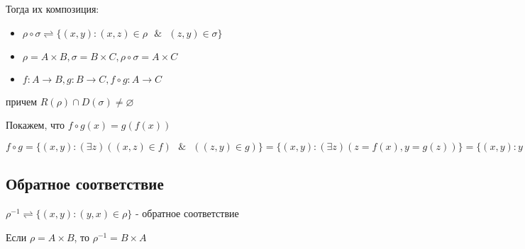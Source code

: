 \documentclass{report}
\newcommand{\band}{\mbox{ } \& \mbox{ }}
\begin{document}
\medskip

Тогда их композиция:
\begin{itemize}
	\item $\rho \circ \sigma \rightleftharpoons \{(x,y): (x,z) \in \rho \band (z,y) \in \sigma\}$
	\item  $\rho = A \times B, \sigma = B \times C, \rho \circ \sigma = A \times C$
	\item $f: A \rightarrow B, g: B \rightarrow C, f \circ g: A \rightarrow C$
\end{itemize}
причем $R(\rho) \cap D(\sigma) \neq \varnothing$

\medskip

Покажем, что $f \circ g(x) = g(f(x))$

\medskip

$f \circ g = \{(x,y): (\exists z)((x,z) \in f) \band ((z,y) \in g)\} = \{(x,y):(\exists z)(z = f(x), y = g(z))\} = \{(x,y): y = g(f(x))\}$

\subsection{Обратное соответствие}
$\rho^{-1} \rightleftharpoons \{(x,y): (y,x) \in \rho\}$ - обратное соответствие


Если $\rho = A \times B$, то $\rho^{-1} = B \times A$
\end{document}
